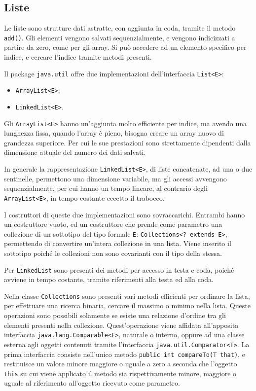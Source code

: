 \documentclass{article}
\numberwithin{equation}{subsection}
\begin{document}
\subsection{Liste}

Le liste sono strutture dati astratte, con aggiunta in coda, tramite il metodo \verb|add()|. Gli elementi vengono salvati sequenzialmente, e vengono indicizzati a partire
da zero, come per gli array. Si può accedere ad un elemento specifico per indice, e cercare l'indice tramite metodi presenti. 

Il package \verb|java.util| offre due implementazioni dell'interfaccia \verb|List<E>|:
\begin{itemize}
    \item \verb|ArrayList<E>|;
    \item \verb|LinkedList<E>|.
\end{itemize}
Gli \verb|ArrayList<E>| hanno un'aggiunta molto efficiente per indice, ma avendo una lunghezza fissa, quando l'array è pieno, bisogna creare un array nuovo di grandezza 
superiore. 
Per cui le sue prestazioni sono strettamente dipendenti dalla dimensione attuale del numero dei dati salvati. 


In generale la rappresentazione \verb|LinkedList<E>|, di liste concatenate, ad una o due sentinelle, permettono una dimensione variabile, ma gli accessi 
avvengono sequenzialmente, per cui hanno un tempo lineare, al contrario degli \verb|ArrayList<E>|, in tempo costante eccetto il trabocco. 


I costruttori di queste due implementazioni sono sovraccarichi. Entrambi hanno un costruttore vuoto, ed un costruttore che prende come parametro una collezione di un sottotipo 
del tipo formale \verb|E|: \verb|Collections<? extends E>|, permettendo di convertire un'intera collezione in una lista. Viene inserito il sottotipo poiché le collezioni 
non sono covarianti con il tipo della stessa. 


Per \verb|LinkedList| sono presenti dei metodi per accesso in testa e coda, poiché avviene in tempo costante, tramite riferimenti alla testa ed alla coda. 


Nella classe \verb|Collections| sono presenti vari metodi efficienti per ordinare la lista, per effettuare una ricerca binaria, cercare il massimo o minimo nella lista. 
Queste operazioni sono possibili solamente se esiste una relazione d'ordine tra gli elementi presenti nella collezione. 
Quest'operazione viene affidata all'apposita interfaccia \verb|java.lang.Comparable<E>|, naturale o interno, oppure ad una classe esterna agli oggetti contenuti tramite 
l'interfaccia \verb|java.util.Comparator<T>|. 
La prima interfaccia consiste nell'unico metodo \verb|public int compareTo(T that)|, e restituisce un valore minore maggiore o uguale a zero a seconda che l'oggetto 
\verb|this| su cui viene applicato il metodo sia rispettivamente minore, maggiore o uguale al riferimento all'oggetto ricevuto come parametro. 
\end{document}
